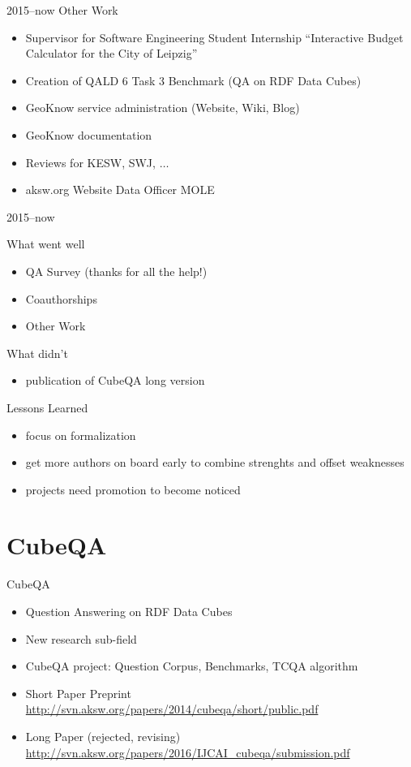 \documentclass[14pt]{beamer}
\begin{document}
\begin{frame}{2015--now Other Work}
\begin{itemize}
\item Supervisor for Software Engineering Student Internship \enquote{Interactive Budget Calculator for the City of Leipzig}
\item Creation of QALD 6 Task 3 Benchmark (QA on RDF Data Cubes)
\item GeoKnow service administration (Website, Wiki, Blog)
\item GeoKnow documentation
\item Reviews for KESW, SWJ, $\ldots$
\item aksw.org Website Data Officer MOLE
\end{itemize}
\end{frame}

\begin{frame}{2015--now }
\begin{block}{What went well}
\begin{itemize}
\item QA Survey (thanks for all the help!) 
\item Coauthorships 
\item Other Work 
\end{itemize}
\end{block}
\begin{block}{What didn't}
\begin{itemize}
\item publication of CubeQA long version
\end{itemize}
\end{block}
\end{frame}

\begin{frame}{Lessons Learned}
\begin{itemize}
\item focus on formalization 
\item get more authors on board early to combine strenghts and offset weaknesses 
\item projects need promotion to become noticed 
\end{itemize}
\end{frame}

\section{CubeQA}

\begin{frame}{CubeQA}
\begin{itemize}
\item Question Answering on RDF Data Cubes 
\item New research sub-field 
\item CubeQA project: Question Corpus, Benchmarks, TCQA algorithm
\item Short Paper Preprint \url{http://svn.aksw.org/papers/2014/cubeqa/short/public.pdf} 
\item Long Paper (rejected, revising) \url{http://svn.aksw.org/papers/2016/IJCAI\_cubeqa/submission.pdf}
\end{itemize}
\end{frame}
\end{document}
